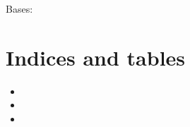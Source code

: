 \documentclass[letterpaper,10pt,english]{sphinxmanual}
\begin{document}
\begin{fulllineitems}
\label{CORMAT_GUI:CORMAT_GUI._translate}
\end{fulllineitems}


\begin{fulllineitems}
\label{CORMAT_GUI:CORMAT_GUI.Ui_CORMAT_py}
Bases: 

\begin{fulllineitems}
\label{CORMAT_GUI:CORMAT_GUI.Ui_CORMAT_py.setupUi}
\end{fulllineitems}


\begin{fulllineitems}
\label{CORMAT_GUI:CORMAT_GUI.Ui_CORMAT_py.retranslateUi}
\end{fulllineitems}


\end{fulllineitems}



\chapter{Indices and tables}
\label{index:indices-and-tables}\begin{itemize}
\item {} 

\item {} 

\item {} 

\end{itemize}
\end{document}
